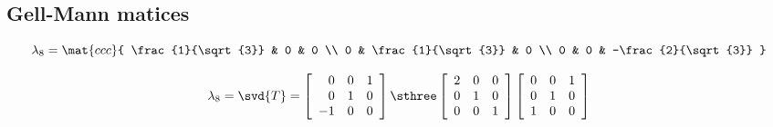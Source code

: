 \subsection{Gell-Mann matices}

\begin{equation}
  \lambda_{8} =
  \mat{ccc}
  {
 \frac{1}{\sqrt{3}} & 0 & 0 \\
 0 & \frac{1}{\sqrt{3}} & 0 \\
 0 & 0 & -\frac{2}{\sqrt{3}}
  }
\end{equation}


\begin{equation}
 \lambda_{8} = \svd{T} =
 \left[
\begin{array}{rcc}
 0 & 0 & 1 \\
 0 & 1 & 0 \\
 -1 & 0 & 0
\end{array}
\right]
\sthree
\left[
\begin{array}{ccc}
 2 & 0 & 0 \\
 0 & 1 & 0 \\
 0 & 0 & 1
\end{array}
\right]
\left[
\begin{array}{ccc}
 0 & 0 & 1 \\
 0 & 1 & 0 \\
 1 & 0 & 0
\end{array}
\right]
\end{equation}

\endinput
